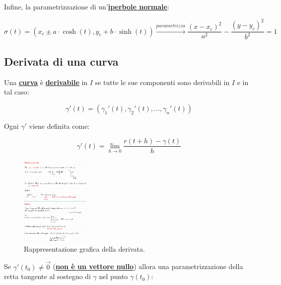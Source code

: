 \documentclass[a4paper]{article}
\begin{document}
	\noindent
	Infine, la parametrizzazione di un'\textcolor{Red3}{\textbf{\underline{iperbole normale}}}:
	
	\begin{equation*}
		\sigma\left(t\right) = \left(x_{c} \pm a \cdot \cosh\left(t\right), y_{c} + b \cdot \sinh\left(t\right)\right) \xrightarrow{parametrizza} \dfrac{\left(x - x_{c}\right)^{2}}{a^{2}} - \dfrac{\left(y - y_{c}\right)^{2}}{b^{2}} = 1
	\end{equation*}

	\newpage
	
	\subsection{Derivata di una curva}
	
	Una \textcolor{Red3}{\textbf{\underline{curva}}} è \textcolor{Red3}{\textbf{\underline{derivabile}}} in $I$ se tutte le sue componenti sono derivabili in $I$ e in tal caso:
	
	\begin{equation*}
		\gamma'\left(t\right) = \left(\gamma_{1}'\left(t\right), \gamma_{2}'\left(t\right), ..., \gamma_{n}'\left(t\right)\right)
	\end{equation*}
	
	\noindent
	Ogni $\gamma'$ viene definita come:
	
	\begin{equation*}
		\gamma'\left(t\right) = \lim_{h \rightarrow 0} \dfrac{r\left(t+h\right) - \gamma\left(t\right)}{h}
	\end{equation*}

	\begin{figure}[!htp]
		\centering
		\includegraphics[width=0.3\textwidth]{img/derivata_curva.pdf}
		\caption{Rappresentazione grafica della derivata.}
	\end{figure}

	\noindent
	Se $\gamma'\left(t_{0}\right) \ne \overrightarrow{0}$ (\textcolor{Red3}{\textbf{\underline{non è un vettore nullo}}}) allora una parametrizzazione della retta tangente al sostegno di $\gamma$ nel punto $\gamma\left(t_{0}\right)$:
	
\end{document}
